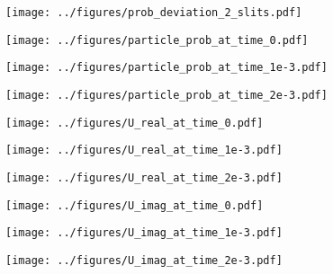 \documentclass[english,notitlepage,reprint,nofootinbib]{revtex4-1}  %
\begin{document}
\begin{figure}[H]
	\centering
	\texttt{[image: ../figures/prob\_deviation\_2\_slits.pdf]} %
	\caption{}
	\label{fig:dev_2_slits}
\end{figure}	
	
\begin{figure}[H]
	\centering
	\texttt{[image: ../figures/particle\_prob\_at\_time\_0.pdf]} %
	\caption{}
	\label{fig:particle_t_0}
\end{figure}

\begin{figure}[H]
	\centering
	\texttt{[image: ../figures/particle\_prob\_at\_time\_1e-3.pdf]} %
	\caption{}
	\label{fig:particle_t_1}
\end{figure}

\begin{figure}[H]
	\centering
	\texttt{[image: ../figures/particle\_prob\_at\_time\_2e-3.pdf]} %
	\caption{}
	\label{fig:particle_t_2}
\end{figure}

\begin{figure}[H]
	\centering
	\texttt{[image: ../figures/U\_real\_at\_time\_0.pdf]} %
	\caption{}
	\label{fig:Re_t_0}
\end{figure}

\begin{figure}[H]
	\centering
	\texttt{[image: ../figures/U\_real\_at\_time\_1e-3.pdf]} %
	\caption{}
	\label{fig:Re_t_1}
\end{figure}

\begin{figure}[H]
	\centering
	\texttt{[image: ../figures/U\_real\_at\_time\_2e-3.pdf]} %
	\caption{}
	\label{fig:Re_t_2}
\end{figure}

\begin{figure}[H]
	\centering
	\texttt{[image: ../figures/U\_imag\_at\_time\_0.pdf]} %
	\caption{}
	\label{fig:Im_t_0}
\end{figure}

\begin{figure}[H]
	\centering
	\texttt{[image: ../figures/U\_imag\_at\_time\_1e-3.pdf]} %
	\caption{}
	\label{fig:Im_t_1}
\end{figure}

\begin{figure}[H]
	\centering
	\texttt{[image: ../figures/U\_imag\_at\_time\_2e-3.pdf]} %
	\caption{}
	\label{fig:Im_t_2}
\end{figure}
\end{document}
